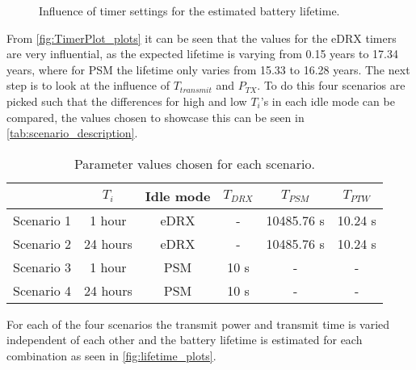 \begin{figure}[H]
\centering
\begin{minipage}{0.48\textwidth}
\resizebox{\textwidth}{!}{
}
\end{minipage}
\hfill
\begin{minipage}{0.48\textwidth}
\resizebox{\textwidth}{!}{
}
\end{minipage}
\caption{Influence of timer settings for the estimated battery lifetime.}
\label{fig:TimerPlot_plots}
\end{figure}

From \autoref{fig:TimerPlot_plots} it can be seen that the values for the eDRX timers are very influential, as the expected lifetime is varying from 0.15 years to 17.34 years, where for PSM the lifetime only varies from 15.33 to 16.28 years. The next step is to look at the influence of $T_{transmit}$ and $P_{TX}$. To do this four scenarios are picked such that the differences for high and low $T_i$'s in each idle mode can be compared, the values chosen to showcase this can be seen in \autoref{tab:scenario_description}.


\begin{table}[H]
\centering
\begin{tabular}{|c|c|c|c|c|c|} \hline
			& $T_i$ 		& Idle mode	& $T_{DRX}$	& $T_{PSM}$	& $T_{PTW}$	\\ \hline
Scenario 1	& 1 hour 	& eDRX 		& -			& 10485.76 s& 10.24 s	\\ \hline
Scenario 2	& 24 hours 	& eDRX 		& -			& 10485.76 s& 10.24 s	\\ \hline
Scenario 3	& 1 hour 	& PSM		& 10 s		& -			& -			\\ \hline
Scenario 4	& 24 hours 	& PSM		& 10 s		& -			& -			\\ \hline
\end{tabular}
\caption{Parameter values chosen for each scenario.}
\label{tab:scenario_description}
\end{table}

For each of the four scenarios the transmit power and transmit time is varied independent of each other and the battery lifetime is estimated for each combination as seen in \autoref{fig:lifetime_plots}.


